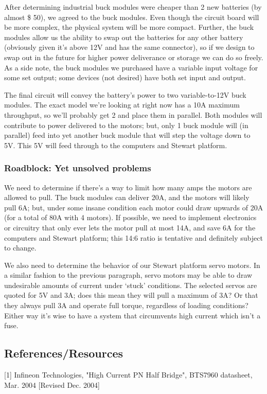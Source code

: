 \documentclass[a4paper, 10pt]{article}
\begin{document}
		After determining industrial buck modules were cheaper than 2 new batteries (by almost \$ 50), we agreed to the buck modules. Even though the circuit board will be more complex, the physical system will be more compact. Further, the buck modules allow us the ability to swap out the batteries for any other battery (obviously given it's above 12V and has the same connector), so if we design to swap out in the future for higher power deliverance or storage we can do so freely. As a side note, the buck modules we purchased have a variable input voltage for some set output; some devices (not desired) have both set input and output.
		
		The final circuit will convey the battery's power to two variable-to-12V buck modules. The exact model we're looking at right now has a 10A maximum throughput, so we'll probably get 2 and place them in parallel. Both modules will contribute to power delivered to the motors; but, only 1 buck module will (in parallel) feed into yet another buck module that will step the voltage down to 5V. This 5V will feed through to the computers and Stewart platform.
		
		\subsubsection{Roadblock: Yet \textbf{unsolved} problems}
		We need to determine if there's a way to limit how many amps the motors are allowed to pull. The buck modules can deliver 20A, and the motors will likely pull 6A; but, under some insane condition each motor could draw upwards of 20A (for a total of 80A with 4 motors). If possible, we need to implement electronics or circuitry that only ever lets the motor pull at most 14A, and save 6A for the computers and Stewart platform; this 14:6 ratio is tentative and definitely subject to change.
		
		We also need to determine the behavior of our Stewart platform servo motors. In a similar fashion to the previous paragraph, servo motors may be able to draw undesirable amounts of current under `stuck' conditions. The selected servos are quoted for 5V and 3A; does this mean they will pull a maximum of 3A? Or that they always pull 3A and operate full torque, regardless of loading conditions? Either way it's wise to have a system that circumvents high current which isn't a fuse.
		
	\subsection{References/Resources}
		[1] Infineon Technologies, "High Current PN Half Bridge", BTS7960 datasheet, Mar. 2004 [Revised Dec. 2004]
		
\end{document}
